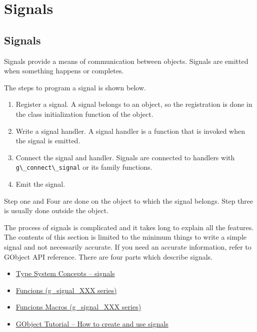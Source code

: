 \section{Signals}\label{signals}

\subsection{Signals}\label{signals-1}

Signals provide a means of communication between objects. Signals are
emitted when something happens or completes.

The steps to program a signal is shown below.

\begin{enumerate}
\def\labelenumi{\arabic{enumi}.}
\tightlist
\item
  Register a signal. A signal belongs to an object, so the registration
  is done in the class initialization function of the object.
\item
  Write a signal handler. A signal handler is a function that is invoked
  when the signal is emitted.
\item
  Connect the signal and handler. Signals are connected to handlers with
  \passthrough{\lstinline!g\_connect\_signal!} or its family functions.
\item
  Emit the signal.
\end{enumerate}

Step one and Four are done on the object to which the signal belongs.
Step three is usually done outside the object.

The process of signals is complicated and it takes long to explain all
the features. The contents of this section is limited to the minimum
things to write a simple signal and not necessarily accurate. If you
need an accurate information, refer to GObject API reference. There are
four parts which describe signals.

\begin{itemize}
\tightlist
\item
  \href{https://docs.gtk.org/gobject/concepts.html\#signals}{Type System
  Concepts -- signals}
\item
  \href{https://docs.gtk.org/gobject/\#functions}{Funcions
  (g\_signal\_XXX series)}
\item
  \href{https://docs.gtk.org/gobject/\#function_macros}{Funcions Macros
  (g\_signal\_XXX series)}
\item
  \href{https://docs.gtk.org/gobject/tutorial.html\#how-to-create-and-use-signals}{GObject
  Tutorial -- How to create and use signals}
\end{itemize}

